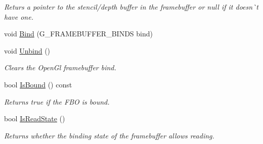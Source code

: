 \begin{DoxyCompactItemize}
\begin{DoxyCompactList}\small\item\em Returs a pointer to the stencil/depth buffer in the framebuffer or null if it doesn\`{}t have one. \end{DoxyCompactList}\item 
void \mbox{\hyperlink{class_geometry_engine_1_1_geometry_buffer_1_1_g_framebuffer_object_a0608caec59adf85a55effb74f0c9c8c9}{Bind}} (G\+\_\+\+F\+R\+A\+M\+E\+B\+U\+F\+F\+E\+R\+\_\+\+B\+I\+N\+DS bind)
\item 
\mbox{\label{class_geometry_engine_1_1_geometry_buffer_1_1_g_framebuffer_object_a92a9b095f3f5197e7397959280c347a3}} 
void \mbox{\hyperlink{class_geometry_engine_1_1_geometry_buffer_1_1_g_framebuffer_object_a92a9b095f3f5197e7397959280c347a3}{Unbind}} ()
\begin{DoxyCompactList}\small\item\em Clears the Open\+Gl framebuffer bind. \end{DoxyCompactList}\item 
\mbox{\label{class_geometry_engine_1_1_geometry_buffer_1_1_g_framebuffer_object_a82e542e77dc898f11aac6fc398d7aaf2}} 
bool \mbox{\hyperlink{class_geometry_engine_1_1_geometry_buffer_1_1_g_framebuffer_object_a82e542e77dc898f11aac6fc398d7aaf2}{Is\+Bound}} () const
\begin{DoxyCompactList}\small\item\em Returns true if the F\+BO is bound. \end{DoxyCompactList}\item 
\mbox{\label{class_geometry_engine_1_1_geometry_buffer_1_1_g_framebuffer_object_a1cbff39a9324214f0a1aef224d030994}} 
bool \mbox{\hyperlink{class_geometry_engine_1_1_geometry_buffer_1_1_g_framebuffer_object_a1cbff39a9324214f0a1aef224d030994}{Is\+Read\+State}} ()
\begin{DoxyCompactList}\small\item\em Returns whether the binding state of the framebuffer allows reading. \end{DoxyCompactList}\item 
\mbox{\label{class_geometry_engine_1_1_geometry_buffer_1_1_g_framebuffer_object_ae3a57669df01cf7303f2b07f1da07e50}} 

\end{DoxyCompactItemize}
